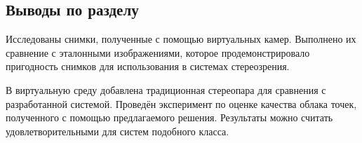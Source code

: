 \subsection{Выводы по разделу}

Исследованы снимки, полученные с помощью виртуальных камер. Выполнено их сравнение с эталонными изображениями,  
которое продемонстрировало пригодность снимков для использования в системах стереозрения.

В виртуальную среду добавлена традиционная стереопара для сравнения с разработанной системой. Проведён эксперимент
по оценке качества облака точек, полученного с помощью предлагаемого решения. Результаты можно считать удовлетворительными 
для систем подобного класса. %


